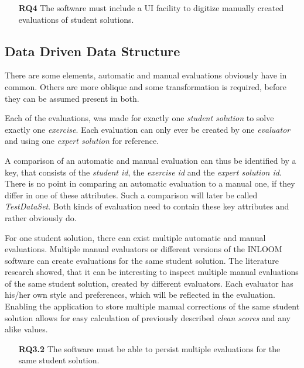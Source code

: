 \begin{itemize}
    \item[\textbf{RQ4}] The software must include a UI facility to digitize manually created 
    evaluations of student solutions. 
\end{itemize}



\subsection{Data Driven Data Structure}
\label{DataDrivenDataStructure}

There are some elements, automatic and manual evaluations obviously have in common. Others are
more oblique and some transformation is required, before they can be assumed present in both. 

Each of the evaluations, was made for exactly one \textit{student solution} to solve exactly one 
\textit{exercise}. Each evaluation can only ever be created by one \textit{evaluator} and 
using one \textit{expert solution} for reference. 

A comparison of an automatic and manual evaluation can thus be identified by a key, that consists
of the \textit{student id}, the \textit{exercise id} and the \textit{expert solution id}. There 
is no point in comparing an automatic evaluation to a manual one, if they differ in one of these
attributes. Such a comparison will later be called \textit{TestDataSet}. Both kinds of evaluation
need to contain these key attributes and rather obviously do.

For one student solution, there can exist multiple automatic and manual evaluations. Multiple
manual evaluators or different versions of the INLOOM software can create evaluations for 
the same student solution. The literature research showed, that it can be interesting to inspect
multiple manual evaluations of the same student solution, created by different evaluators. Each
evaluator has his/her own style and preferences, which will be reflected in the evaluation. 
Enabling the application to store multiple manual corrections of the same student solution 
allows for easy calculation of previously described \textit{clean scores} and any alike values. 

\begin{itemize}
    \item[\textbf{RQ3.2}] The software must be able to persist multiple evaluations for the 
    same student solution. 
\end{itemize}

